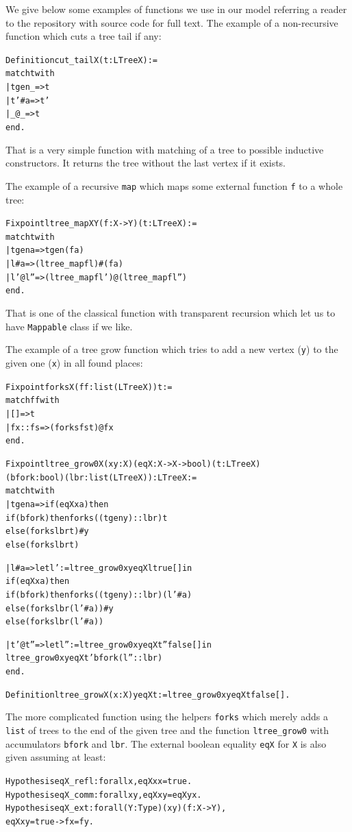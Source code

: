 \documentclass[12pt]{article}
\newcommand{\begver}{\begin{alltt}\begin{footnotesize}}
\newcommand{\enver}{\end{footnotesize}\end{alltt}}
\begin{document}
We give below some examples of functions we use in our model referring a reader to the repository with source code for full text.
The example of a non-recursive function which cuts a tree tail if any:
\begver
Definition cut_tail {X} (t:LTree X) :=
match t with
| tgen _ => t
| t' # a => t'
| _ @ _ => t
end. 
\enver
That is a very simple function with matching of a tree to possible inductive constructors. It returns the tree without the last vertex if it exists. 

The example of a recursive \texttt{map} which maps some external function \texttt{f} to a whole tree:
\begver
Fixpoint ltree_map {X Y} (f: X -> Y) (t: LTree X) :=
match t with
| tgen a => tgen (f a)
| l # a => (ltree_map f l) # (f a)
| l' @ l'' => (ltree_map f l') @ (ltree_map f l'')
end.
\enver
That is one of the classical function with transparent recursion which let us to have \texttt{Mappable} class if we like. 

The example of a tree grow function which tries to add a new vertex (\texttt{y}) to the given one (\texttt{x}) in all found places:
\begver
Fixpoint forks {X} (ff: list (LTree X)) t := 
match ff with
| [] => t
| fx :: fs => (forks fs t) @ fx
end.

Fixpoint ltree_grow0 {X} (x y: X) (eqX: X -> X -> bool) (t: LTree X) 
                    (bfork: bool) (lbr: list (LTree X)): LTree X :=
match t with
  | tgen a =>  if (eqX x a) then
                  if (bfork) then forks ((tgen y)::lbr) t
                             else (forks lbr t) # y
               else (forks lbr t)

  | l # a => let l' := ltree_grow0 x y eqX l true [] in
             if (eqX x a) then 
                 if (bfork) then forks ((tgen y)::lbr) (l' # a) 
                            else (forks lbr (l' # a)) # y 
             else (forks lbr (l' # a))
 
  | t' @ t'' => let l'' := ltree_grow0 x y eqX t'' false [] in
                    ltree_grow0 x y eqX t' bfork (l''::lbr)                   
end.

Definition ltree_grow {X} (x:X) y eqX t := ltree_grow0 x y eqX t false [].  
\enver
The more complicated function using the helpers \texttt{forks} which merely adds a \texttt{list} of trees to the end of the given tree and the function 
\texttt{ltree\_grow0} with accumulators \texttt{bfork} and \texttt{lbr}. The external boolean equality \texttt{eqX} for \texttt{X} is also given assuming at least:
\begver
Hypothesis eqX_refl: forall x, eqX x x = true.
Hypothesis eqX_comm: forall x y, eqX x y = eqX y x.
Hypothesis eqX_ext: forall (Y: Type) (x y) (f: X -> Y), 
                                     eqX x y = true -> f x = f y.
\enver 
\end{document}
